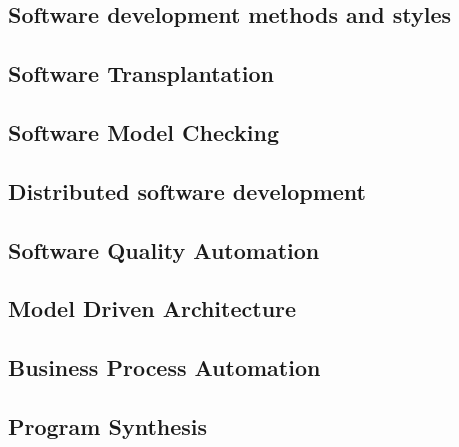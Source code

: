 \subsection{Software development methods and styles}
\label{c:literatur:summaries:soft-dev-methods}


\subsection{Software Transplantation}
\label{c:literatur:summaries:soft-trans}


\subsection{Software Model Checking}
\label{c:literatur:summaries:model-checking}


\subsection{Distributed software development}
\label{c:literatur:summaries:dist-soft-dev}


\subsection{Software Quality Automation}
\label{c:literatur:summaries:quality-auto}


\subsection{Model Driven Architecture}
\label{c:literatur:summaries:model-driven-arch}


\subsection{Business Process Automation}
\label{c:literatur:summaries:busi-process-auto}


\subsection{Program Synthesis}
\label{c:literatur:summaries:prog-syn}

